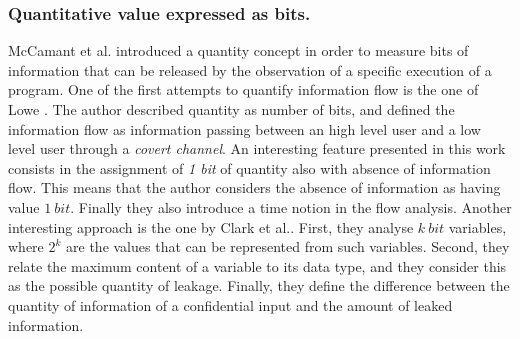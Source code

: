 \documentclass{llncs}
\begin{document}
\subsubsection{Quantitative value expressed as bits.}
McCamant et al. \cite{McCamant06,McCamant08} introduced a quantity concept in order to measure bits of information that can be released by the observation of a specific execution of a program.  One of the first attempts to quantify information flow is the one of Lowe \cite{Lowe02}. The author described quantity as number of bits, and defined the information flow as information passing between an high level user and a low level user through a \emph{covert channel}. An interesting feature presented in this work consists in the assignment of \emph{1 bit} of quantity also with absence of information flow. This means that the author considers the absence of information as having value $1\ bit$. Finally they also introduce a time notion in the flow analysis.
Another interesting approach is the one by Clark et al.\cite{Clark04,city191}.  First, they analyse $k\ bit$ variables, where $2^k$ are the values that can be represented from such variables. Second, they relate the maximum content of a variable to its data type, and they consider this as the possible quantity of leakage. Finally, they define the difference between the quantity of information of a confidential input and the amount of leaked information.
\end{document}
